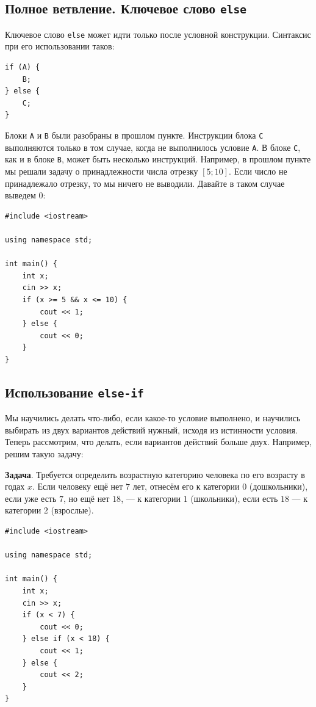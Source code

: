 \documentclass{article}
\newcommand{\task}[1]{\textbf{Задача}. #1}
\begin{document}
	\subsection{Полное ветвление. Ключевое слово \texttt{else}}
	
	Ключевое слово \texttt{else} может идти только после условной конструкции. Синтаксис при его использовании таков:
	
	\begin{lstlisting}
if (A) {
	B;
} else {
	C;
}
	\end{lstlisting}
	
	Блоки \texttt{A} и \texttt{B} были разобраны в прошлом пункте. Инструкции блока \texttt{C} выполняются только в том случае, когда не выполнилось условие \texttt{A}. В блоке \texttt{C}, как и в блоке \texttt{B}, может быть несколько инструкций. Например, в прошлом пункте мы решали задачу о принадлежности числа отрезку $[5; 10]$. Если число не принадлежало отрезку, то мы ничего не выводили. Давайте в таком случае выведем $0$:
	
	\begin{lstlisting}
#include <iostream>

using namespace std;

int main() {
	int x;
	cin >> x;
	if (x >= 5 && x <= 10) {
		cout << 1;
	} else {
		cout << 0;
	}
}
	\end{lstlisting}
	
	\subsection{Использование \texttt{else-if}}
	
	Мы научились делать что-либо, если какое-то условие выполнено, и научились выбирать из двух вариантов действий нужный, исходя из истинности условия. Теперь рассмотрим, что делать, если вариантов действий больше двух. Например, решим такую задачу:
	
	\task{Требуется определить возрастную категорию человека по его возрасту в годах $x$. Если человеку ещё нет $7$ лет, отнесём его к категории $0$ (дошкольники), если уже есть $7$, но ещё нет $18$, --- к категории $1$ (школьники), если есть $18$ --- к категории $2$ (взрослые).}
	
	\begin{lstlisting}
#include <iostream>

using namespace std;

int main() {
	int x;
	cin >> x;
	if (x < 7) {
		cout << 0;
	} else if (x < 18) {
		cout << 1;
	} else {
		cout << 2;
	}
}
	\end{lstlisting}
	
\end{document}
